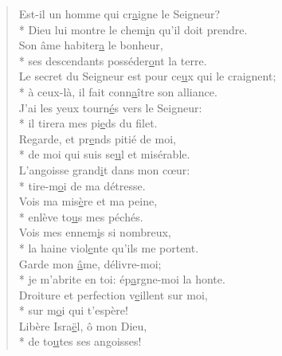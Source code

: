 \begin{verse}
Est-il un homme qui cr\underline{a}igne le Seigneur? \\*
Dieu lui montre le chem\underline{i}n qu’il doit prendre. \\
Son âme habiter\underline{a} le bonheur, \\*
ses descendants posséder\underline{o}nt la terre. \\
Le secret du Seigneur est pour ce\underline{u}x qui le craignent; \\*
à ceux-là, il fait conn\underline{a}ître son alliance. \\

J’ai les yeux tourn\underline{é}s vers le Seigneur: \\*
il tirera mes pi\underline{e}ds du filet. \\
Regarde, et pr\underline{e}nds pitié de moi, \\*
de moi qui suis se\underline{u}l et misérable. \\

L’angoisse grand\underline{i}t dans mon cœur: \\*
tire-m\underline{o}i de ma détresse. \\
Vois ma mis\underline{è}re et ma peine, \\*
enlève to\underline{u}s mes péchés. \\

Vois mes ennem\underline{i}s si nombreux, \\*
la haine viol\underline{e}nte qu’ils me portent. \\
Garde mon \underline{â}me, délivre-moi; \\*
je m’abrite en toi: ép\underline{a}rgne-moi la honte. \\
Droiture et perfection v\underline{e}illent sur moi, \\*
sur m\underline{o}i qui t’espère! \\

Libère Isra\underline{ë}l, ô mon Dieu, \\*
de to\underline{u}tes ses angoisses! \\
\end{verse}

